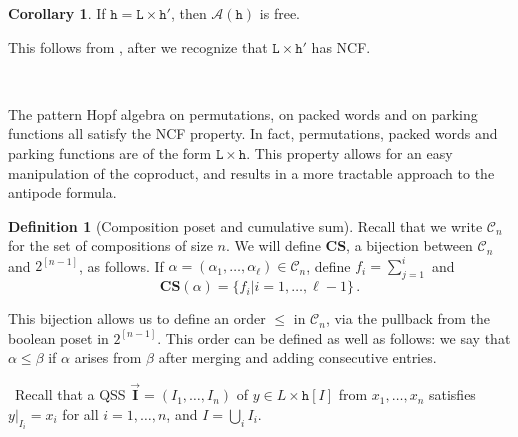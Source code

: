 \documentclass[12pt, reqno]{amsart}
\theoremstyle{definition}
\newtheorem{cor}[thm]{Corollary}
\newtheorem{defin}[thm]{Definition}
\newcommand{\III}{\vec{\mathbf{I}}}
\begin{document}
\begin{cor}
If $\mathtt{h} = \mathtt{L} \times \mathtt{h}'$, then $\mathcal A(\mathtt{h})$ is free.
\end{cor}
This follows from \cite{Vargas}, after we recognize that $\mathtt{L} \times \mathtt{h}'$ has NCF.

\

The pattern Hopf algebra on permutations, on packed words and on parking functions all satisfy the NCF property.
In fact, permutations, packed words and parking functions are of the form $\mathtt{L} \times \mathtt{h}$.
This property allows for an easy manipulation of the coproduct, and results in a more tractable approach to the antipode formula.

\begin{defin}[Composition poset and cumulative sum]
Recall that we write $\mathcal C_n$ for the set of compositions of size $n$.
We will define $\mathbf{CS}$, a bijection between $\mathcal C_n $ and $2^{[n-1]}$, as follows.
If $\alpha =(\alpha_1, \dots, \alpha_{\ell} ) \in \mathcal C_n$, define $f_i = \sum_{j=1}^i$ and 
$$\mathbf{CS}(\alpha) = \{f_i | i = 1, \dots, \ell - 1\} \, .$$

This bijection allows us to define an order $\leq $ in $\mathcal C_n$, via the pullback from the boolean poset in $2^{[n-1]}$.
This order can be defined as well as follows: we say that $\alpha \leq \beta$ if $\alpha$ arises from $\beta $ after merging and adding consecutive entries.
\end{defin}

\
Recall that a QSS $\III = (I_1, \dots , I_n)$ of $y\in L\times \mathtt{h}[I]$ from $x_1, \dots, x_n$ satisfies $y|_{I_i} = x_i$ for all $i = 1, \dots , n$, and $I = \bigcup_i I_i$.
\end{document}

